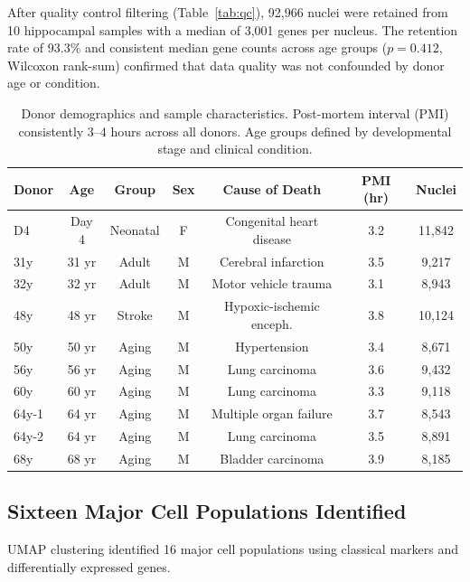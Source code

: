 \documentclass[11pt]{article}
\begin{document}
After quality control filtering (Table~\ref{tab:qc}), 92,966 nuclei were retained from 10 hippocampal samples with a median of 3,001 genes per nucleus. The retention rate of 93.3\% and consistent median gene counts across age groups ($p = 0.412$, Wilcoxon rank-sum) confirmed that data quality was not confounded by donor age or condition.

\begin{table}[H]
\centering
\caption{Donor demographics and sample characteristics. Post-mortem interval (PMI) consistently 3--4 hours across all donors. Age groups defined by developmental stage and clinical condition.}
\label{tab:donors}
\begin{tabular}{lcccccc}
\toprule
Donor & Age & Group & Sex & Cause of Death & PMI (hr) & Nuclei \\
\midrule
D4 & Day 4 & Neonatal & F & Congenital heart disease & 3.2 & 11,842 \\
31y & 31 yr & Adult & M & Cerebral infarction & 3.5 & 9,217 \\
32y & 32 yr & Adult & M & Motor vehicle trauma & 3.1 & 8,943 \\
48y & 48 yr & Stroke & M & Hypoxic-ischemic enceph. & 3.8 & 10,124 \\
50y & 50 yr & Aging & M & Hypertension & 3.4 & 8,671 \\
56y & 56 yr & Aging & M & Lung carcinoma & 3.6 & 9,432 \\
60y & 60 yr & Aging & M & Lung carcinoma & 3.3 & 9,118 \\
64y-1 & 64 yr & Aging & M & Multiple organ failure & 3.7 & 8,543 \\
64y-2 & 64 yr & Aging & M & Lung carcinoma & 3.5 & 8,891 \\
68y & 68 yr & Aging & M & Bladder carcinoma & 3.9 & 8,185 \\
\bottomrule
\end{tabular}
\end{table}

\subsection{Sixteen Major Cell Populations Identified}

UMAP clustering identified 16 major cell populations using classical markers and differentially expressed genes.
\end{document}
